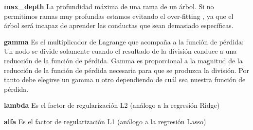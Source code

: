 \textbf{max\_depth} 
La profundidad máxima de una rama de un árbol.
Si no permitimos ramas muy profundas estamos evitando el over-fitting , ya que el árbol será incapaz de aprender las conductas que sean demasiado específicas.

\textbf{gamma}
Es el multiplicador de Lagrange que acompaña a la función de pérdida:
Un nodo se divide solamente cuando el resultado de la división conduce a una reducción de la función de pérdida. Gamma es proporcional a la magnitud de la reducción de la función de pérdida necesaria para que se produzca la división. Por tanto debe elegirse un gamma u otro dependiendo de cuál sea nuestra función de pérdida.

\textbf{lambda}
Es el factor de regularización L2 (análogo a la regresión Ridge)

\textbf{alfa}
Es el factor de regularización L1 (análogo a la regresión Lasso)











































